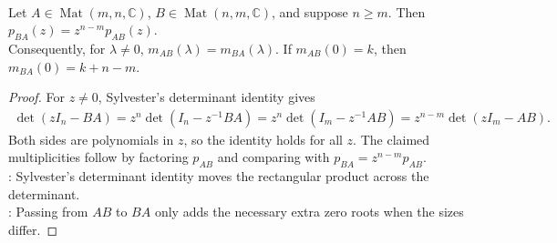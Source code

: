 \begin{theorem} \label{thm:ab-ba-nonzero-eigenvalues} \\
Let $A\in\operatorname{Mat}(m,n,\mathbb{C})$, $B\in\operatorname{Mat}(n,m,\mathbb{C})$, and suppose $n\geq m$. Then $p_{BA}(z)=z^{n-m}p_{AB}(z)$.\\
Consequently, for $\lambda\neq0$, $m_{AB}(\lambda)=m_{BA}(\lambda)$. If $m_{AB}(0)=k$, then $m_{BA}(0)=k+n-m$.
\begin{proof}
For $z\neq0$, Sylvester's determinant identity gives
\begin{align}
\det(zI_n-BA) =z^n\det(I_n-z^{-1}BA) =z^n\det(I_m-z^{-1}AB) =z^{n-m}\det(zI_m-AB).
\nonumber
\end{align}
Both sides are polynomials in $z$, so the identity holds for all $z$. The claimed multiplicities follow by factoring $p_{AB}$ and comparing with $p_{BA}=z^{n-m}p_{AB}$.\\
: Sylvester's determinant identity moves the rectangular product across the determinant.\\
: Passing from $AB$ to $BA$ only adds the necessary extra zero roots when the sizes differ.
\end{proof}
\end{theorem}

